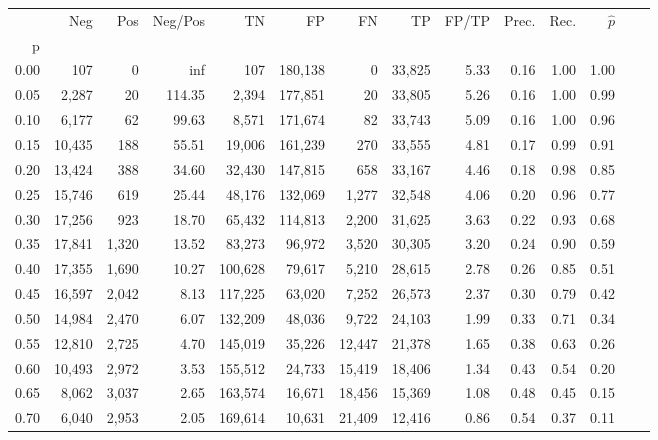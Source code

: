 \begin{tabular}{rrrrrrrrrrrrrr}
\toprule
{} &     Neg &    Pos & Neg/Pos &       TN &       FP &      FN &      TP & FP/TP & Prec. &  Rec. & $\hat{p}$ \\
p    &         &        &         &          &          &         &         &       &       &       &           \\
\midrule
0.00 &     107 &      0 &     inf &      107 &  180,138 &       0 &  33,825 &  5.33 &  0.16 &  1.00 &      1.00 \\
0.05 &   2,287 &     20 &  114.35 &    2,394 &  177,851 &      20 &  33,805 &  5.26 &  0.16 &  1.00 &      0.99 \\
0.10 &   6,177 &     62 &   99.63 &    8,571 &  171,674 &      82 &  33,743 &  5.09 &  0.16 &  1.00 &      0.96 \\
0.15 &  10,435 &    188 &   55.51 &   19,006 &  161,239 &     270 &  33,555 &  4.81 &  0.17 &  0.99 &      0.91 \\
0.20 &  13,424 &    388 &   34.60 &   32,430 &  147,815 &     658 &  33,167 &  4.46 &  0.18 &  0.98 &      0.85 \\
0.25 &  15,746 &    619 &   25.44 &   48,176 &  132,069 &   1,277 &  32,548 &  4.06 &  0.20 &  0.96 &      0.77 \\
0.30 &  17,256 &    923 &   18.70 &   65,432 &  114,813 &   2,200 &  31,625 &  3.63 &  0.22 &  0.93 &      0.68 \\
0.35 &  17,841 &  1,320 &   13.52 &   83,273 &   96,972 &   3,520 &  30,305 &  3.20 &  0.24 &  0.90 &      0.59 \\
0.40 &  17,355 &  1,690 &   10.27 &  100,628 &   79,617 &   5,210 &  28,615 &  2.78 &  0.26 &  0.85 &      0.51 \\
0.45 &  16,597 &  2,042 &    8.13 &  117,225 &   63,020 &   7,252 &  26,573 &  2.37 &  0.30 &  0.79 &      0.42 \\
0.50 &  14,984 &  2,470 &    6.07 &  132,209 &   48,036 &   9,722 &  24,103 &  1.99 &  0.33 &  0.71 &      0.34 \\
0.55 &  12,810 &  2,725 &    4.70 &  145,019 &   35,226 &  12,447 &  21,378 &  1.65 &  0.38 &  0.63 &      0.26 \\
0.60 &  10,493 &  2,972 &    3.53 &  155,512 &   24,733 &  15,419 &  18,406 &  1.34 &  0.43 &  0.54 &      0.20 \\
0.65 &   8,062 &  3,037 &    2.65 &  163,574 &   16,671 &  18,456 &  15,369 &  1.08 &  0.48 &  0.45 &      0.15 \\
0.70 &   6,040 &  2,953 &    2.05 &  169,614 &   10,631 &  21,409 &  12,416 &  0.86 &  0.54 &  0.37 &      0.11 \\

\end{tabular}
